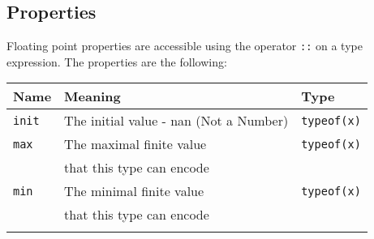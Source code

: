 \subsection{Properties}
\label{sec:org52a5d6e}

Floating point properties are accessible using the operator \texttt{::} on a
type expression. The properties are the following:

\begin{center}
  \vspace{-5pt}
  \begin{adjustbox}{max width=1.01\linewidth}
    \begin{threeparttable}
      \begin{tabular}{|l|ll|}
        \hline
        Name & Meaning & Type\\[0pt]
        \hline
        \hline
        \texttt{init} & The initial value - nan (Not a Number) & \texttt{typeof(x)}\\[0pt]
        \Xhline{0.001pt}
        \texttt{max} & The maximal finite value & \texttt{typeof(x)}\\
        & that this type can encode & \\[0pt]
        \Xhline{0.001pt}

        \texttt{min} & The minimal finite value & \texttt{typeof(x)}\\
        & that this type can encode & \\[0pt]
        \Xhline{0.001pt}


\end{tabular}
\end{threeparttable}
\end{adjustbox}
\end{center}

